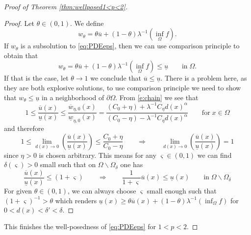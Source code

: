 \documentclass[11pt,reqno]{amsart}
\numberwithin{figure}{section}
\theoremstyle{plain}
\theoremstyle{remark}
\numberwithin{equation}{section}
\begin{document}
\begin{appendices}
\begin{proof} [Proof of Theorem \ref{thm:wellposed1<p<2}]
\begin{proof} Let $\theta\in (0,1)$. We define
\begin{equation*}
    w_\theta = \theta \overline{u} + (1-\theta)\lambda^{-1}\left(\inf_{\Omega} f\right).
\end{equation*}
If $w_\theta$ is a subsolution to \eqref{eq:PDEeps}, then we can use comparison principle to obtain that
\begin{equation*}
    w_\theta = \theta \overline{u} + (1-\theta)\lambda^{-1}\left(\inf_{\Omega} f\right) \leq \underline{u} \qquad\text{in}\;\Omega.
\end{equation*}
If that is the case, let $\theta\to 1$ we conclude that $\overline{u} \leq \underline{u}$. There is a problem here, as they are both explosive solutions, to use comparison principle we need to show that $w_\theta \leq \underline{u}$ in a neighborhood of $\partial\Omega$. From \eqref{e:chain} we see that
\begin{equation*}
    1\leq \frac{\overline{u}(x)}{\underline{u}(x)} \leq \frac{\overline{w}_{\eta,0}(x)}{\underline{w}_{\eta,0}(x)} = \frac{(C_0+\eta)+\lambda^{-1}C_\eta d(x)^\alpha}{(C_0-\eta)-\lambda^{-1}C_\eta d(x)^\alpha} \qquad\text{for}\;x\in \Omega
\end{equation*}
and therefore
\begin{equation*}
   1\leq  \lim_{d(x)\to 0} \left(\frac{\overline{u}(x)}{\underline{u}(x)}\right) \leq \frac{C_0+\eta}{C_0-\eta} \qquad\Longrightarrow\qquad  \lim_{d(x)\to 0} \left(\frac{\overline{u}(x)}{\underline{u}(x)}\right) = 1
\end{equation*}
since $\eta>0$ is chosen arbitrary. This means for any $\varsigma\in(0,1)$ we can find $\delta(\varsigma)>0$ small such that on $\Omega\backslash \Omega_\delta$ one has
\begin{equation*}
\frac{\overline{u}(x)}{\underline{u}(x)}\leq (1+\varsigma)     \qquad\Longrightarrow\qquad \frac{1}{1+\varsigma} \overline{u}(x) \leq \underline{u}(x) \qquad\text{in}\; \Omega\backslash \Omega_\delta
\end{equation*}
For given $\theta\in (0,1)$, we can always choose $\varsigma$ small enough such that $(1+\varsigma)^{-1} > \theta$ which renders $\underline{u}(x) \geq \theta \overline{u}(x) + (1-\theta)\lambda^{-1}\left(\inf_\Omega f\right)$ for $0< d(x) < \delta' < \delta$.
\end{proof}
\noindent This finishes the well-posedness of \eqref{eq:PDEeps} for $1<p<2$.
\end{proof}



\end{appendices}
\end{document}
